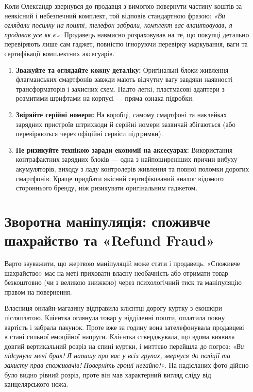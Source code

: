 Коли Олександр звернувся до продавця з вимогою повернути частину коштів за неякісний і небезпечний комплект, той відповів стандартною фразою: \textit{«Ви оглядали посилку на пошті, телефон забрали, комплект вас влаштовував, я продавав усе як є»}. Продавець навмисно розраховував на те, що покупці детально перевіряють лише сам гаджет, повністю ігноруючи перевірку маркування, ваги та сертифікації комплектних аксесуарів.

\vspace{0.8em}

\begin{enumerate}
    \item \textbf{Зважуйте та оглядайте кожну деталіку:} Оригінальні блоки живлення флагманських смартфонів завжди мають відчутну вагу завдяки наявності трансформаторів і захисних схем. Надто легкі, пластмасові адаптери з розмитими шрифтами на корпусі — пряма ознака підробки.
    \item \textbf{Звіряйте серійні номери:} На коробці, самому смартфоні та наклейках зарядних пристроїв штрихкоди й серійні номери зазвичай збігаються (або перевіряються через офіційні сервіси підтримки).
    \item \textbf{Не ризикуйте технікою заради економії на аксесуарах:} Використання контрафактних зарядних блоків — одна з найпоширеніших причин вибуху акумуляторів, виходу з ладу контролерів живлення та повної поломки дорогих смартфонів. Краще придбати якісний сертифікований аналог відомого стороннього бренду, ніж ризикувати оригінальним гаджетом.
\end{enumerate}

\section{Зворотна маніпуляція: споживче шахрайство та «Refund Fraud»}

Варто зауважити, що жертвою маніпуляцій може стати і продавець. «Споживче шахрайство» має на меті приховати власну необачність або отримати товар безкоштовно (чи з великою знижкою) через психологічний тиск та маніпуляцію правом на повернення.

 Власниця онлайн-магазину відправила клієнтці дорогу куртку з екошкіри післяплатою. Клієнтка оглянула товар у відділенні пошти, оплатила повну вартість і забрала пакунок. Проте вже за годину вона зателефонувала продавцеві в стані сильної емоційної напруги. Клієнтка стверджувала, що вдома виявила довгий вертикальний розріз на спині куртки, і миттєво перейшла до погроз: \textit{«Ви підсунули мені брак! Я напишу про вас у всіх групах, звернуся до поліції та захисту прав споживачів! Поверніть гроші негайно!»}. На надісланих фото дійсно було видно рівний розріз, проте він мав характерний вигляд сліду від канцелярського ножа.

